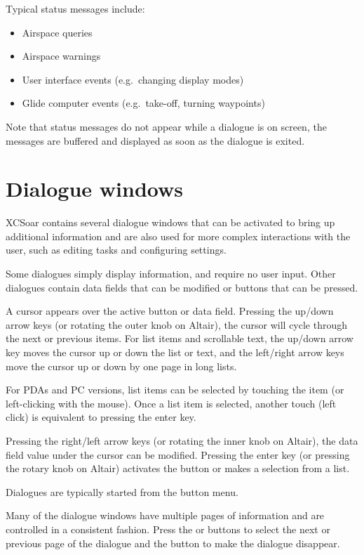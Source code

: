 Typical status messages include:
\begin{itemize}
\item Airspace queries
\item Airspace warnings
\item User interface events (e.g.\ changing display modes)
\item Glide computer events (e.g.\ take-off, turning waypoints)
\end{itemize}

Note that status messages do not appear while a dialogue is on screen, the
messages are buffered and displayed as soon as the dialogue is exited.


\section{Dialogue windows}\label{sec:dialog-windows}

XCSoar contains several dialogue windows that can be activated to bring up
additional information and are also used for more complex interactions with the
user, such as editing tasks and configuring settings.

Some dialogues simply display information, and require no user input. Other
dialogues contain data fields that can be modified or buttons that can be pressed.

A cursor appears over the active button or data field. Pressing the up/down
arrow keys (or rotating the outer knob on Altair), the cursor will cycle
through the next or previous items. For list items and scrollable text, the
up/down arrow key moves the cursor up or down the list or text, and the
left/right arrow keys move the cursor up or down by one page in long lists.

For PDAs and PC versions, list items can be selected by touching the item (or
left-clicking with the mouse). Once a list item is selected, another touch
(left click) is equivalent to pressing the enter key.

Pressing the right/left arrow keys (or rotating the inner knob on Altair), the
data field value under the cursor can be modified. Pressing the enter key (or
pressing the rotary knob on Altair) activates the button or makes a selection
from a list.

Dialogues are typically started from the button menu.

Many of the dialogue windows have multiple pages of information and are controlled
in a consistent fashion. Press the \bmenuw{$<$} or \bmenuw{$>$} buttons to
select the next or previous page of the dialogue and the  button
to make the dialogue disappear.


